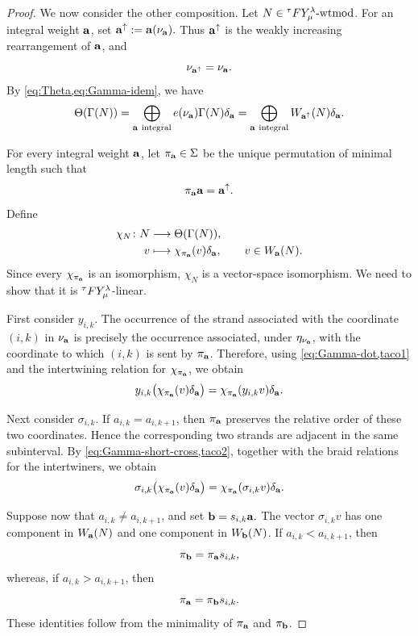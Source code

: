 \begin{proof}
We now consider the other composition. Let \(N\in{}^\tau F Y_\mu^\lambda\text{-wtmod}\). For an
integral weight \(\mathbf{a}\), set
\(
   \mathbf{a}^\uparrow:=\mathbf{a}(\nu_{\mathbf{a}}).
\)
Thus \(\mathbf{a}^\uparrow\) is the weakly increasing rearrangement of
\(\mathbf{a}\), and
\[
   \nu_{\mathbf{a}^\uparrow}=\nu_{\mathbf{a}}.
\]
By \cref{eq:Theta,eq:Gamma-idem}, we have
\[
\begin{aligned}
   \Theta(\Gamma(N))
   =
   \bigoplus_{\mathbf{a}\ \mathrm{integral}}
   e(\nu_{\mathbf{a}})\Gamma(N)\delta_{\mathbf{a}}                              
   =
   \bigoplus_{\mathbf{a}\ \mathrm{integral}}
   W_{\mathbf{a}^\uparrow}(N)\delta_{\mathbf{a}}.
\end{aligned}
\]

For every integral weight \(\mathbf{a}\), let
\(\pi_{\mathbf{a}}\in\Sigma\) be the 
unique permutation of minimal length such that
\[
   \pi_{\mathbf{a}}\mathbf{a}=\mathbf{a}^\uparrow.
\]
Define
\[
\begin{aligned}
   \chi_N\colon N&\longrightarrow\Theta(\Gamma(N)),\\
   v&\longmapsto
   \chi_{\pi_{\mathbf{a}}}(v)\delta_{\mathbf{a}},
   \qquad v\in W_{\mathbf{a}}(N).
 \end{aligned}
\]
Since every \(\chi_{\pi_{\mathbf{a}}}\) is an isomorphism, \(\chi_N\) is a
vector-space isomorphism. We need to show that it is
\({}^\tau F Y_\mu^\lambda\)-linear.

First consider \(y_{i,k}\). The occurrence of the strand associated
with the coordinate \((i,k)\) in \(\nu_{\mathbf{a}}\) is precisely the
occurrence associated, under \(\eta_{\nu_{\mathbf{a}}}\), with the coordinate
to which \((i,k)\) is sent by \(\pi_{\mathbf{a}}\). Therefore,
using \cref{eq:Gamma-dot,taco1} and the intertwining relation for
\(\chi_{\pi_{\mathbf{a}}}\), we obtain
\[
   y_{i,k}
   \bigl(
      \chi_{\pi_{\mathbf{a}}}(v)\delta_{\mathbf{a}}
   \bigr)
   =
   \chi_{\pi_{\mathbf{a}}}(y_{i,k}v)\delta_{\mathbf{a}}.
\]

Next consider \(\sigma_{i,k}\). If
\(a_{i,k}=a_{i,k+1}\), then $\pi_{\mathbf{a}}$ preserves
the relative order of these two coordinates. Hence the corresponding two
strands are adjacent in the same subinterval. By
\cref{eq:Gamma-short-cross,taco2}, together with the braid relations
for the intertwiners, we obtain
\[
   \sigma_{i,k}
   \bigl(
      \chi_{\pi_{\mathbf{a}}}(v)\delta_{\mathbf{a}}
   \bigr)
   =
   \chi_{\pi_{\mathbf{a}}}(\sigma_{i,k}v)\delta_{\mathbf{a}}.
\]

Suppose now that \(a_{i,k}\neq a_{i,k+1}\), and set
\(
\mathbf{b}=s_{i,k}\mathbf{a}.
\)
The vector \(\sigma_{i,k}v\) has one component in \(W_{\mathbf{a}}(N)\) and
one component in \(W_{\mathbf{b}}(N)\). If \(a_{i,k}<a_{i,k+1}\), then
\[
\pi_{\mathbf{b}}=\pi_{\mathbf{a}} s_{i,k},
\]
whereas, if \(a_{i,k}>a_{i,k+1}\), then
\[
\pi_{\mathbf{a}}=\pi_{\mathbf{b}} s_{i,k}.
\]
These identities follow from the minimality of \(\pi_{\mathbf{a}}\) and
\(\pi_{\mathbf{b}}\).


\end{proof}
